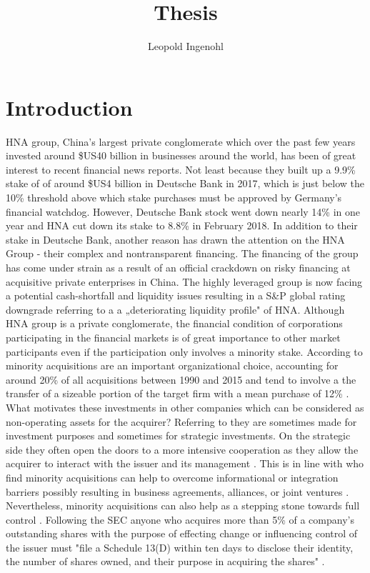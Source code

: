 \documentclass[12pt]{article}
\title{Thesis}
\author{Leopold Ingenohl}
\begin{document}
\maketitle



\section{Introduction}

HNA group, China's largest private conglomerate which over the past few years invested around \$US40 billion in businesses around the world, has been of great interest to recent financial news reports. Not least because they built up a 9.9\% stake of of around \$US4 billion in Deutsche Bank in 2017, which is just below the 10\% threshold above which stake purchases must be approved by Germany's financial watchdog. %
However, Deutsche Bank stock went down nearly 14\% in one year and HNA cut down its stake to 8.8\% in February 2018. 
In addition to their stake in Deutsche Bank, another reason has drawn the attention on the HNA Group - their complex and nontransparent financing. The financing of the group has come under strain as a result of an official crackdown on risky financing at acquisitive private enterprises in China. The highly leveraged group is now facing a potential cash-shortfall and liquidity issues resulting in a S\&P global rating downgrade referring to a a „deteriorating liquidity profile" of HNA. Although HNA group is a private conglomerate, the financial condition of corporations participating in the financial markets is of great importance to other market participants even if the participation only involves a minority stake. 
According to \citet{Huang2017} minority acquisitions are an important organizational choice, accounting for around 20\% of all acquisitions between 1990 and 2015 and tend to involve a the transfer of a sizeable portion of the target firm with a mean purchase of 12\% \citep{Ouimet2013}. What motivates these investments in other companies which can be considered as non-operating assets for the acquirer? Referring to \citet{Damodaran2005} they are sometimes made for investment purposes and sometimes for strategic investments. On the strategic side they often open the doors to a more intensive cooperation as they allow the acquirer to interact with the issuer and its management \citep{Povel2014}. This is in line with \citet{Huang2017} who find minority acquisitions can help to overcome informational or integration barriers possibly resulting in business agreements, alliances, or joint ventures \citep{Allen2000}. Nevertheless, minority acquisitions can also help as a stepping stone towards full control \citep{Huang2017}. Following the SEC anyone who acquires more than 5\% of a company's outstanding shares with the purpose of effecting change or influencing control of the issuer must "file a Schedule 13(D) within ten days to disclose their identity, the number of shares owned, and their purpose in acquiring the shares" \citep[p. xx]{Goldman2005}. 
\end{document}
